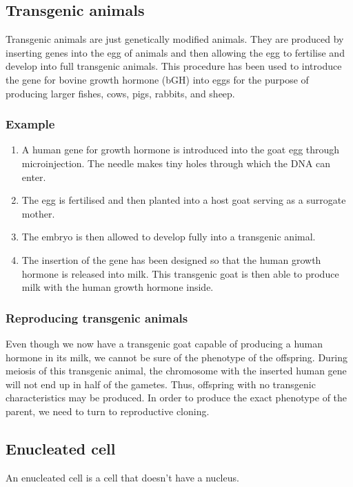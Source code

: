 \documentclass[11pt]{article}
\begin{document}
\subsection{Transgenic animals}
\label{sec:org1a396b0}
Transgenic animals are just genetically modified animals. They are produced by inserting genes into the egg of animals and then allowing the egg to fertilise and develop into full transgenic animals. This procedure has been used to introduce the gene for bovine growth hormone (bGH) into eggs for the purpose of producing larger fishes, cows, pigs, rabbits, and sheep.
\subsubsection{Example}
\label{sec:org5d488f4}
\begin{enumerate}
\item A human gene for growth hormone is introduced into the goat egg through microinjection. The needle makes tiny holes through which the DNA can enter.
\item The egg is fertilised and then planted into a host goat serving as a surrogate mother.
\item The embryo is then allowed to develop fully into a transgenic animal.
\item The insertion of the gene has been designed so that the human growth hormone is released into milk. This transgenic goat is then able to produce milk with the human growth hormone inside.
\end{enumerate}
\subsubsection{Reproducing transgenic animals}
\label{sec:org5b4754f}
Even though we now have a transgenic goat capable of producing a human hormone in its milk, we cannot be sure of the phenotype of the offspring. During meiosis of this transgenic animal, the chromosome with the inserted human gene will not end up in half of the gametes. Thus, offspring with no transgenic characteristics may be produced. In order to produce the exact phenotype of the parent, we need to turn to reproductive cloning.
\subsection{Enucleated cell}
\label{sec:orgee54acf}
An enucleated cell is a cell that doesn't have a nucleus.

\newpage
\end{document}
